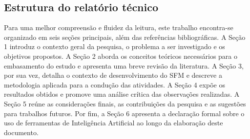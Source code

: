 \subsection{Estrutura do relatório técnico}

Para uma melhor compreensão e fluidez da leitura, este trabalho encontra-se organizado em seis seções principais, além das referências bibliográficas. A Seção 1 introduz o contexto geral da pesquisa, o problema a ser investigado e os objetivos propostos. A Seção 2 aborda os conceitos teóricos necessários para o embasamento do estudo e apresenta uma breve revisão da literatura. A Seção 3, por sua vez, detalha o contexto de desenvolvimento do SFM e descreve a metodologia aplicada para a condução das atividades. A Seção 4 expõe os resultados obtidos e promove uma análise crítica das observações realizadas. A Seção 5 reúne as considerações finais, as contribuições da pesquisa e as sugestões para trabalhos futuros. Por fim, a Seção 6 apresenta a declaração formal sobre o uso de ferramentas de Inteligência Artificial ao longo da elaboração deste documento.